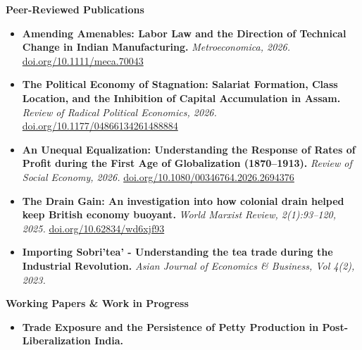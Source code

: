 \documentclass[letterpaper,11pt]{article}
\begin{document}
\vspace{4pt}
\textbf{\color{primarycolor}Peer-Reviewed Publications}
\begin{itemize}[leftmargin=0.15in, label={\textcolor{accentcolor}{\textbullet}}, itemsep=0pt]
  \item \small{\textbf{\color{textgray}Amending Amenables: Labor Law and the Direction of Technical Change in Indian Manufacturing.} \textit{\color{lightgray}Metroeconomica, 2026.} \href{https://doi.org/10.1111/meca.70043}{\color{accentcolor}doi.org/10.1111/meca.70043}}
  \item \small{\textbf{\color{textgray}The Political Economy of Stagnation: Salariat Formation, Class Location, and the Inhibition of Capital Accumulation in Assam.} \textit{\color{lightgray}Review of Radical Political Economics, 2026.} \href{https://doi.org/10.1177/04866134261488884}{\color{accentcolor}doi.org/10.1177/04866134261488884}}
  \item \small{\textbf{\color{textgray}An Unequal Equalization: Understanding the Response of Rates of Profit during the First Age of Globalization (1870--1913).} \textit{\color{lightgray}Review of Social Economy, 2026.} \href{https://doi.org/10.1080/00346764.2026.2694376}{\color{accentcolor}doi.org/10.1080/00346764.2026.2694376}}
  \item \small{\textbf{\color{textgray}The Drain Gain: An investigation into how colonial drain helped keep British economy buoyant.} \textit{\color{lightgray}World Marxist Review, 2(1):93–120, 2025.} \href{https://doi.org/10.62834/wd6xjf93}{\color{accentcolor}doi.org/10.62834/wd6xjf93}}
  \item \small{\textbf{\color{textgray}Importing Sobri'tea' - Understanding the tea trade during the Industrial Revolution.} \textit{\color{lightgray}Asian Journal of Economics \& Business, Vol 4(2), 2023.}}
\end{itemize}

\vspace{4pt}
\textbf{\color{primarycolor}Working Papers \& Work in Progress}
\begin{itemize}[leftmargin=0.15in, label={\textcolor{accentcolor}{\textbullet}}, itemsep=0pt]
  \item \small{\textbf{\color{textgray}Trade Exposure and the Persistence of Petty Production in Post-Liberalization India.}}
\end{itemize}

\newpage
\end{document}
